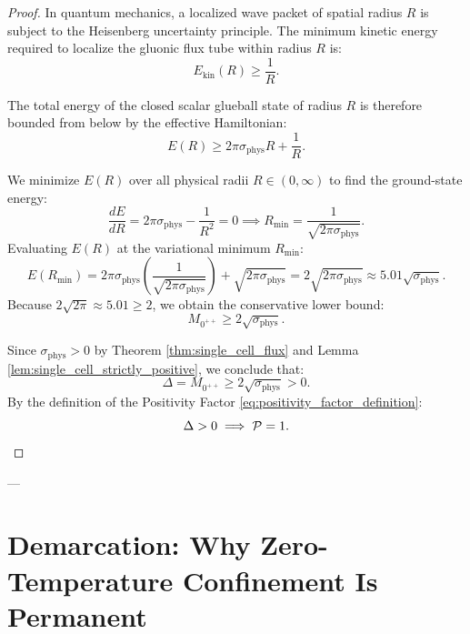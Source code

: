 \begin{proof}
In quantum mechanics, a localized wave packet of spatial radius $R$ is subject to the Heisenberg uncertainty principle. The minimum kinetic energy required to localize the gluonic flux tube within radius $R$ is:
\begin{equation}
\label{eq:ch11_kinetic_uncertainty}
E_{\mathrm{kin}}(R) \ge \frac{1}{R}.
\end{equation}

The total energy of the closed scalar glueball state of radius $R$ is therefore bounded from below by the effective Hamiltonian:
\begin{equation}
\label{eq:ch11_total_energy_radius}
E(R) \ge 2\pi \sigma_{\mathrm{phys}} R + \frac{1}{R}.
\end{equation}

We minimize $E(R)$ over all physical radii $R \in (0, \infty)$ to find the ground-state energy:
\begin{equation}
\frac{d E}{dR} = 2\pi \sigma_{\mathrm{phys}} - \frac{1}{R^2} = 0 \implies R_{\min} = \frac{1}{\sqrt{2\pi \sigma_{\mathrm{phys}}}}.
\end{equation}
Evaluating $E(R)$ at the variational minimum $R_{\min}$:
\begin{equation}
E(R_{\min}) = 2\pi \sigma_{\mathrm{phys}} \left( \frac{1}{\sqrt{2\pi \sigma_{\mathrm{phys}}}} \right) + \sqrt{2\pi \sigma_{\mathrm{phys}}} = 2 \sqrt{2\pi \sigma_{\mathrm{phys}}} \approx 5.01 \sqrt{\sigma_{\mathrm{phys}}}.
\end{equation}
Because $2 \sqrt{2\pi} \approx 5.01 \ge 2$, we obtain the conservative lower bound:
\begin{equation}
M_{0^{++}} \ge 2 \sqrt{\sigma_{\mathrm{phys}}}.
\end{equation}

Since $\sigma_{\mathrm{phys}} > 0$ by Theorem \ref{thm:single_cell_flux} and Lemma \ref{lem:single_cell_strictly_positive}, we conclude that:
\begin{equation}
\Delta = M_{0^{++}} \ge 2 \sqrt{\sigma_{\mathrm{phys}}} > 0.
\end{equation}
By the definition of the Positivity Factor \eqref{eq:positivity_factor_definition}:
\begin{equation}
\Delta > 0 \implies \mathcal{P} = 1. \qedhere
\end{equation}
\end{proof}

---

\section{Demarcation: Why Zero-Temperature Confinement Is Permanent}
\label{sec:demarcation_permanent_confinement}

